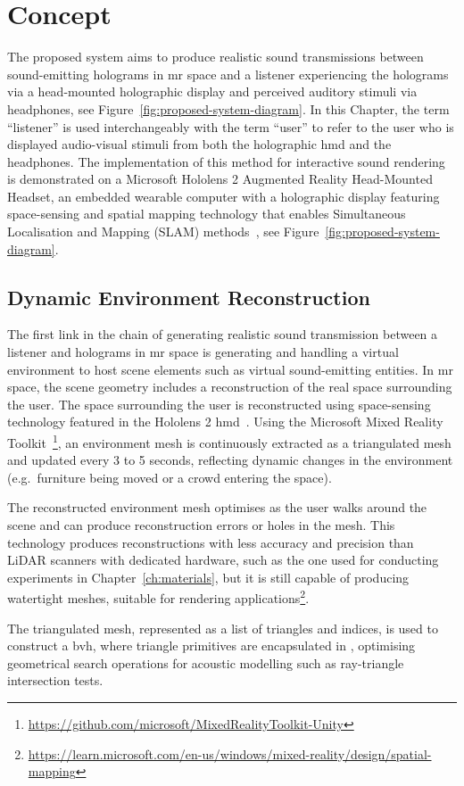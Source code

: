 \section{Concept}\label{sec:overview}
The proposed system aims to produce realistic sound transmissions between sound-emitting holograms in \acrshort{mr} space and a listener experiencing the holograms via a head-mounted holographic display and perceived auditory stimuli via headphones, see Figure~\ref{fig:proposed-system-diagram}. In this Chapter, the term ``listener'' is used interchangeably with the term ``user'' to refer to the user who is displayed audio-visual stimuli from both the holographic \acrshort{hmd} and the headphones. The implementation of this method for interactive sound rendering is demonstrated on a Microsoft Hololens 2 Augmented Reality Head-Mounted Headset, an embedded wearable computer with a holographic display featuring space-sensing and spatial mapping technology that enables Simultaneous Localisation and Mapping (SLAM) methods~\citep{davison2003real, ungureanu2020hololens}, see Figure~\ref{fig:proposed-system-diagram}.\par

\subsection{Dynamic Environment Reconstruction}
The first link in the chain of generating realistic sound transmission between a listener and holograms in \acrshort{mr} space is generating and handling a virtual environment to host scene elements such as virtual sound-emitting entities. In \acrshort{mr} space, the scene geometry includes a reconstruction of the real space surrounding the user. The space surrounding the user is reconstructed using space-sensing technology featured in the Hololens 2 \acrshort{hmd}~\citep{ungureanu2020hololens}. Using the Microsoft Mixed Reality Toolkit~\footnote{\url{https://github.com/microsoft/MixedRealityToolkit-Unity}}, an environment mesh is continuously extracted as a triangulated mesh and updated every 3 to 5 seconds, reflecting dynamic changes in the environment (e.g.\ furniture being moved or a crowd entering the space).\par
The reconstructed environment mesh optimises as the user walks around the scene and can produce reconstruction errors or holes in the mesh. This technology produces reconstructions with less accuracy and precision than LiDAR scanners with dedicated hardware, such as the one used for conducting experiments in Chapter~\ref{ch:materials}, but it is still capable of producing watertight meshes, suitable for rendering applications\footnote{\url{https://learn.microsoft.com/en-us/windows/mixed-reality/design/spatial-mapping}}.\par  
The triangulated mesh, represented as a list of triangles and indices, is used to construct a \acrfull{bvh}, where triangle primitives are encapsulated in , optimising geometrical search operations for acoustic modelling such as ray-triangle intersection tests. 

